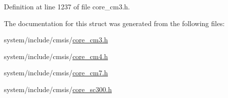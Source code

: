 Definition at line 1237 of file core\+\_\+cm3.\+h.



The documentation for this struct was generated from the following files\+:\begin{DoxyCompactItemize}
\item 
system/include/cmsis/\hyperlink{core__cm3_8h}{core\+\_\+cm3.\+h}\item 
system/include/cmsis/\hyperlink{core__cm4_8h}{core\+\_\+cm4.\+h}\item 
system/include/cmsis/\hyperlink{core__cm7_8h}{core\+\_\+cm7.\+h}\item 
system/include/cmsis/\hyperlink{core__sc300_8h}{core\+\_\+sc300.\+h}\end{DoxyCompactItemize}
